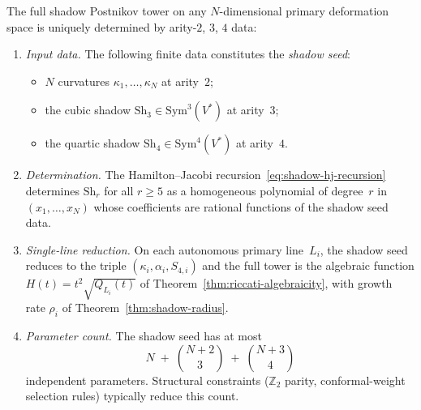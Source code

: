 \begin{theorem}
\label{thm:shadow-finite-determination}
\ClaimStatusProvedHere
{}
The full shadow Postnikov tower on any
$N$-dimensional primary deformation space is uniquely
determined by arity-$2$, $3$, $4$ data:
\begin{enumerate}[label=\textup{(\roman*)}]
\item \emph{Input data.}\enspace
  The following finite data constitutes the
  \emph{shadow seed}:
  \begin{itemize}[nosep]
  \item $N$ curvatures
    $\kappa_1, \dotsc, \kappa_N$ at arity~$2$;
  \item the cubic shadow
    $\mathrm{Sh}_3 \in \mathrm{Sym}^3(V^*)$
    at arity~$3$;
  \item the quartic shadow
    $\mathrm{Sh}_4 \in \mathrm{Sym}^4(V^*)$
    at arity~$4$.
  \end{itemize}

\item \emph{Determination.}\enspace
  The Hamilton--Jacobi recursion~\eqref{eq:shadow-hj-recursion}
  determines $\mathrm{Sh}_r$ for all $r \geq 5$ as a
  homogeneous polynomial of degree~$r$ in
  $(x_1, \dotsc, x_N)$ whose coefficients are rational
  functions of the shadow seed data.

\item \emph{Single-line reduction.}\enspace
  On each autonomous primary line~$L_i$, the shadow seed
  reduces to the triple $(\kappa_i, \alpha_i, S_{4,i})$
  and the full tower is the algebraic function
  $H(t) = t^2\sqrt{Q_{L_i}(t)}$ of
  Theorem~\textup{\ref{thm:riccati-algebraicity}},
  with growth rate $\rho_i$ of
  Theorem~\textup{\ref{thm:shadow-radius}}.

\item \emph{Parameter count.}\enspace
  The shadow seed has at most
  \[
    N
    \;+\;
    \binom{N+2}{3}
    \;+\;
    \binom{N+3}{4}
  \]
  independent parameters.
  Structural constraints
  \textup{(}$\mathbb{Z}_2$ parity, conformal-weight
  selection rules\textup{)} typically reduce this count.
\end{enumerate}
\end{theorem}

